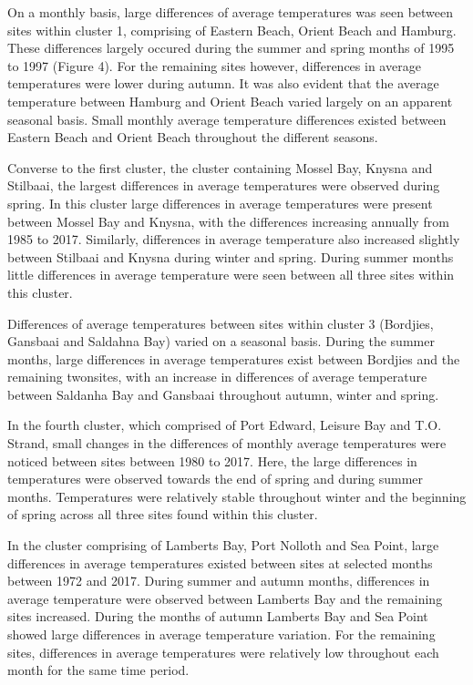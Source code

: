 \documentclass[12pt,a4paper,]{article}
\begin{document}
On a monthly basis, large differences of average temperatures was seen
between sites within cluster 1, comprising of Eastern Beach, Orient
Beach and Hamburg. These differences largely occured during the summer
and spring months of 1995 to 1997 (Figure 4). For the remaining sites
however, differences in average temperatures were lower during autumn.
It was also evident that the average temperature between Hamburg and
Orient Beach varied largely on an apparent seasonal basis. Small monthly
average temperature differences existed between Eastern Beach and Orient
Beach throughout the different seasons.

Converse to the first cluster, the cluster containing Mossel Bay, Knysna
and Stilbaai, the largest differences in average temperatures were
observed during spring. In this cluster large differences in average
temperatures were present between Mossel Bay and Knysna, with the
differences increasing annually from 1985 to 2017. Similarly,
differences in average temperature also increased slightly between
Stilbaai and Knysna during winter and spring. During summer months
little differences in average temperature were seen between all three
sites within this cluster.

Differences of average temperatures between sites within cluster 3
(Bordjies, Gansbaai and Saldahna Bay) varied on a seasonal basis. During
the summer months, large differences in average temperatures exist
between Bordjies and the remaining twonsites, with an increase in
differences of average temperature between Saldanha Bay and Gansbaai
throughout autumn, winter and spring.

In the fourth cluster, which comprised of Port Edward, Leisure Bay and
T.O. Strand, small changes in the differences of monthly average
temperatures were noticed between sites between 1980 to 2017. Here, the
large differences in temperatures were observed towards the end of
spring and during summer months. Temperatures were relatively stable
throughout winter and the beginning of spring across all three sites
found within this cluster.

In the cluster comprising of Lamberts Bay, Port Nolloth and Sea Point,
large differences in average temperatures existed between sites at
selected months between 1972 and 2017. During summer and autumn months,
differences in average temperature were observed between Lamberts Bay
and the remaining sites increased. During the months of autumn Lamberts
Bay and Sea Point showed large differences in average temperature
variation. For the remaining sites, differences in average temperatures
were relatively low throughout each month for the same time period.
\end{document}
